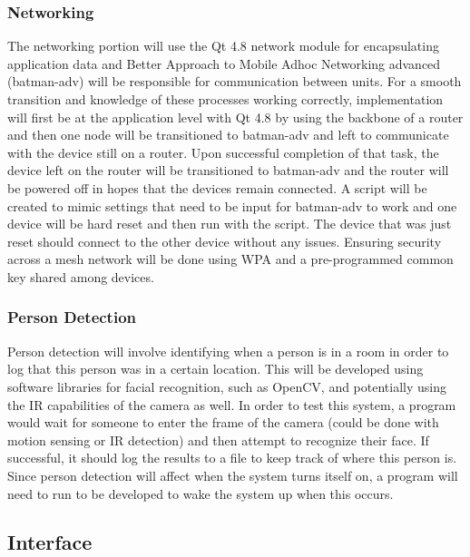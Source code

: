 \documentclass[onecolumn, draftclsnofoot,10pt, compsoc]{IEEEtran}
\begin{document}
\subsubsection{Networking}
The networking portion will use the Qt 4.8 network module for encapsulating application data and Better Approach to Mobile Adhoc Networking advanced (batman-adv) will be responsible for communication between units. For a smooth transition and knowledge of these processes working correctly, implementation will first be at the application level with Qt 4.8 by using the backbone of a router and then one node will be transitioned to batman-adv and left to communicate with the device still on a router. Upon successful completion of that task, the device left on the router will be transitioned to batman-adv and the router will be powered off in hopes that the devices remain connected. A script will be created to mimic settings that need to be input for batman-adv to work and one device will be hard reset and then run with the script. The device that was just reset should connect to the other device without any issues. Ensuring security across a mesh network will be done using WPA and a pre-programmed common key shared among devices.

\subsubsection{Person Detection}
Person detection will involve identifying when a person is in a room in order to log that this person was in a certain location. This will be developed using software libraries for facial recognition, such as OpenCV, and potentially using the IR capabilities of the camera as well. In order to test this system, a program would wait for someone to enter the frame of the camera (could be done with motion sensing or IR detection) and then attempt to recognize their face. If successful, it should log the results to a file to keep track of where this person is. Since person detection will affect when the system turns itself on, a program will need to run to be developed to wake the system up when this occurs.

\subsection{Interface}
\end{document}
